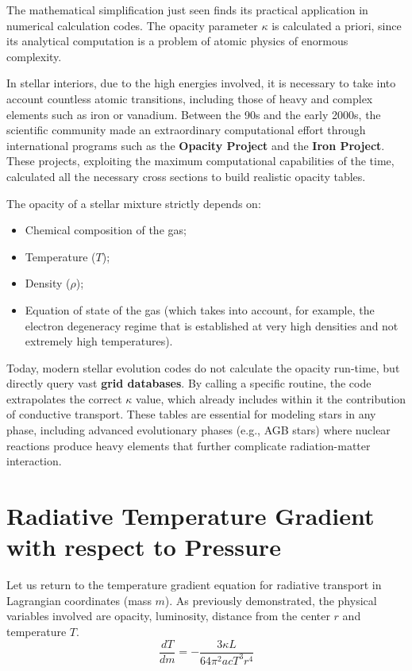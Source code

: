 The mathematical simplification just seen finds its practical application in numerical calculation codes. The opacity parameter $\kappa$ is calculated a priori, since its analytical computation is a problem of atomic physics of enormous complexity.

In stellar interiors, due to the high energies involved, it is necessary to take into account countless atomic transitions, including those of heavy and complex elements such as iron or vanadium. Between the 90s and the early 2000s, the scientific community made an extraordinary computational effort through international programs such as the \textbf{Opacity Project} and the \textbf{Iron Project}. These projects, exploiting the maximum computational capabilities of the time, calculated all the necessary cross sections to build realistic opacity tables.

The opacity of a stellar mixture strictly depends on:
\begin{itemize}
\item Chemical composition of the gas;
\item Temperature ($T$);
\item Density ($\rho$);
\item Equation of state of the gas (which takes into account, for example, the electron degeneracy regime that is established at very high densities and not extremely high temperatures).
\end{itemize}

Today, modern stellar evolution codes do not calculate the opacity run-time, but directly query vast \textbf{grid databases}. By calling a specific routine, the code extrapolates the correct $\kappa$ value, which already includes within it the contribution of conductive transport. These tables are essential for modeling stars in any phase, including advanced evolutionary phases (e.g., AGB stars) where nuclear reactions produce heavy elements that further complicate radiation-matter interaction.

\section{Radiative Temperature Gradient with respect to Pressure}

Let us return to the temperature gradient equation for radiative transport in Lagrangian coordinates (mass $m$). As previously demonstrated, the physical variables involved are opacity, luminosity, distance from the center $r$ and temperature $T$.
\begin{equation}
\frac{dT}{dm} = - \frac{3 \kappa L}{64 \pi^2 a c T^3 r^4}
\end{equation}


